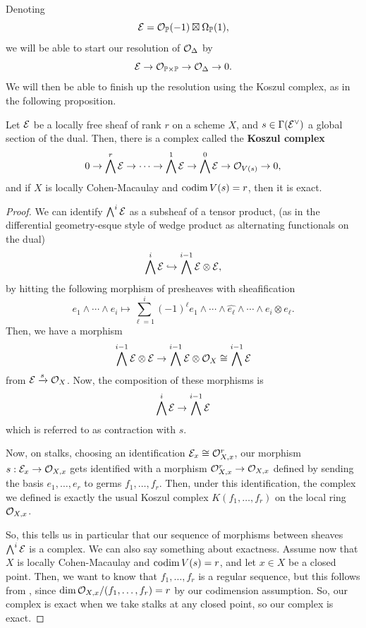 \documentclass[12pt]{article}
\begin{document}
Denoting 
\[\mathcal{E} = \mathcal{O}_{\mathbb{P}}(-1) \boxtimes \Omega_{\mathbb{P}}(1),\]
we will be able to start our resolution of $\mathcal{O}_\Delta$ by
\[\mathcal{E} \to \mathcal{O}_{\mathbb{P}\times \mathbb{P}} \to \mathcal{O}_\Delta \to 0.\]
We will then be able to finish up the resolution using the Koszul complex, as in the following proposition.

\begin{prop}
    Let $\mathcal{E}$ be a locally free sheaf of rank $r$ on a scheme $X$, and $s\in \Gamma(\mathcal{E}^\vee)$ a global section of the dual. Then, there is a complex called the \textbf{Koszul complex} 
    \[0 \to \bigwedge^r \mathcal{E} \to \cdots \to \bigwedge^1 \mathcal{E} \to \bigwedge^0 \mathcal{E} \to \mathcal{O}_{V(s)} \to 0,\]
    and if $X$ is locally Cohen-Macaulay and $\operatorname{codim} V(s) = r$, then it is exact.
\end{prop}

\begin{proof}
    We can identify $\bigwedge^i \mathcal{E}$ as a subsheaf of a tensor product, (as in the differential geometry-esque style of wedge product as alternating functionals on the dual)
    \[\bigwedge^i \mathcal{E} \hookrightarrow \bigwedge^{i-1} \mathcal{E} \otimes \mathcal{E},\]
    by hitting the following morphism of presheaves with sheafification
    \[e_1 \wedge \cdots \wedge e_i \longmapsto \sum_{\ell=1}^i (-1)^\ell e_1 \wedge \cdots \wedge \hat{e_\ell} \wedge \cdots \wedge e_i \otimes e_\ell.\]
    Then, we have a morphism
    \[\bigwedge^{i-1} \mathcal{E} \otimes \mathcal{E} \to \bigwedge^{i-1} \mathcal{E} \otimes \mathcal{O}_X \cong \bigwedge^{i-1} \mathcal{E}\]
    from $\mathcal{E}\xrightarrow{s} \mathcal{O}_X$. Now, the composition of these morphisms is
    \[\bigwedge^i \mathcal{E} \to \bigwedge^{i-1} \mathcal{E}\]
    which is referred to as contraction with $s$.

    Now, on stalks, choosing an identification $\mathcal{E}_x \cong \mathcal{O}_{X,x}^r$, our morphism $s: \mathcal{E}_x \to \mathcal{O}_{X,x}$ gets identified with a morphism $\mathcal{O}_{X,x}^r \to \mathcal{O}_{X,x}$ defined by sending the basis $e_1,\dots,e_r$ to germs $f_1,\dots,f_r$. Then, under this identification, the complex we defined is exactly the usual Koszul complex $K(f_1,\dots,f_r)$ on the local ring $\mathcal{O}_{X,x}$.

    So, this tells us in particular that our sequence of morphisms between sheaves $\bigwedge^i \mathcal{E}$ is a complex. We can also say something about exactness. Assume now that $X$ is locally Cohen-Macaulay and $\operatorname{codim} V(s)=r$, and let $x\in X$ be a closed point. Then, we want to know that $f_1,\dots,f_r$ is a regular sequence, but this follows from \cite[Theorem 2.1.2]{Bruns_Herzog_1998}, since $\dim \mathcal{O}_{X,x}/(f_1,\dots,f_r) = r$ by our codimension assumption. So, our complex is exact when we take stalks at any closed point, so our complex is exact.
\end{proof}
\end{document}
